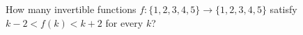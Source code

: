 How many invertible functions $f:\{1,2,3,4,5\}\to\{1,2,3,4,5\}$ satisfy $k-2<f(k)<k+2$ for every $k$?
